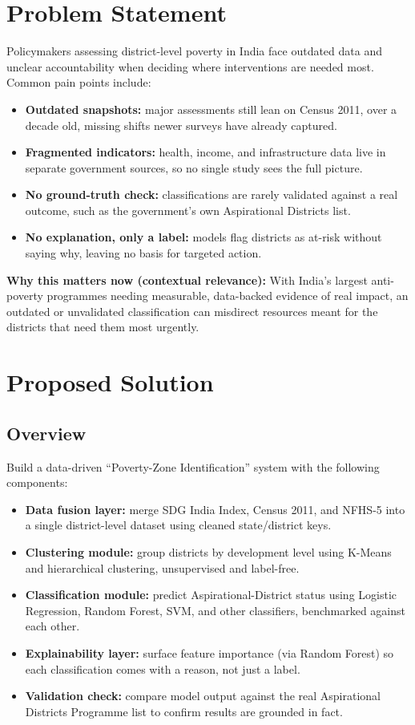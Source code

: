 \documentclass[11pt,a4paper]{article}
\newcommand{\BvrHint}[1]{%
  {\normalfont\normalsize\itshape\hfill #1}}
\begin{document}
\section{Problem Statement}
Policymakers assessing district-level poverty in India face outdated data and unclear accountability when deciding where interventions are needed most. Common pain points include:
\begin{itemize}[leftmargin=0.7cm]
    \item \textbf{Outdated snapshots:} major assessments still lean on Census 2011, over a decade old, missing shifts newer surveys have already captured.
    \item \textbf{Fragmented indicators:} health, income, and infrastructure data live in separate government sources, so no single study sees the full picture.
    \item \textbf{No ground-truth check:} classifications are rarely validated against a real outcome, such as the government's own Aspirational Districts list.
    \item \textbf{No explanation, only a label:} models flag districts as at-risk without saying why, leaving no basis for targeted action.
\end{itemize}

\textbf{Why this matters now (contextual relevance):} With India's largest anti-poverty programmes needing measurable, data-backed evidence of real impact, an outdated or unvalidated classification can misdirect resources meant for the districts that need them most urgently.

\section{Proposed Solution %
}
\subsection{Overview}
Build a data-driven ``Poverty-Zone Identification'' system with the following components:
\begin{itemize}[leftmargin=0.7cm]
    \item \textbf{Data fusion layer:} merge SDG India Index, Census 2011, and NFHS-5 into a single district-level dataset using cleaned state/district keys.
    \item \textbf{Clustering module:} group districts by development level using K-Means and hierarchical clustering, unsupervised and label-free.
    \item \textbf{Classification module:} predict Aspirational-District status using Logistic Regression, Random Forest, SVM, and other classifiers, benchmarked against each other.
    \item \textbf{Explainability layer:} surface feature importance (via Random Forest) so each classification comes with a reason, not just a label.
    \item \textbf{Validation check:} compare model output against the real Aspirational Districts Programme list to confirm results are grounded in fact.
\end{itemize}
\end{document}
